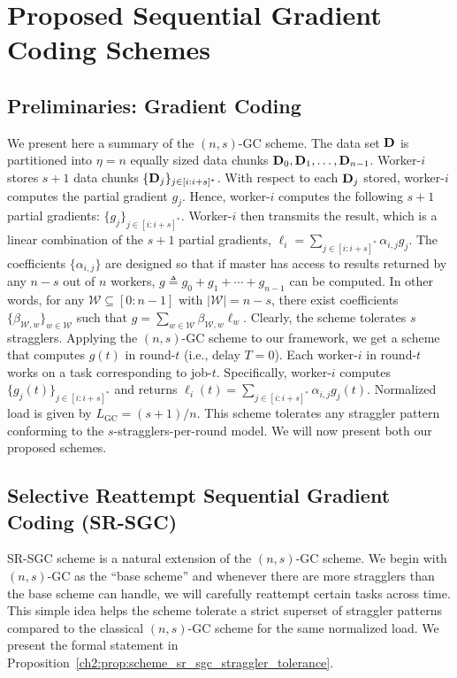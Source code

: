 \section{Proposed Sequential Gradient Coding Schemes}
\subsection{Preliminaries: Gradient Coding}\label{ch2:sec:GC_prelim}

We present here a summary of the $(n,s)$-GC scheme. The data set $\mathbf{D}$ is partitioned into $\eta = n$ equally sized data chunks $\mathbf{D}_0,\mathbf{D}_1,\ldots,\mathbf{D}_{n-1}$.  Worker-$i$ stores $s+1$ data chunks  $\{\mathbf{D}_j\}_{j\in[i:i+s]^*}$. With respect to each $\mathbf{D}_j$ stored, worker-$i$ computes the partial gradient $g_j$. Hence, worker-$i$ computes the following $s+1$ partial gradients: $\{g_j\}_{j\in[i:i+s]^*}$. Worker-$i$ then transmits the result, which is a linear combination of the $s+1$ partial gradients, $\ell_i=\sum_{j\in[i:i+s]^*}\alpha_{i,j}g_j$. The coefficients $\{\alpha_{i,j}\}$ are designed so that if master has access to results returned by any $n-s$ out of $n$ workers, $g\triangleq g_0+g_1+\cdots+g_{n-1}$ can be computed. In other words, for any $\mathcal{W}\subseteq [0:n-1]$ with $|\mathcal{W}|=n-s$, there exist coefficients $\{\beta_{\mathcal{W},w}\}_{w\in\mathcal{W}}$ such that $g=\sum_{w\in\mathcal{W}}\beta_{\mathcal{W},w}\ell_w$. Clearly, the scheme tolerates $s$ stragglers. Applying the $(n,s)$-GC scheme to our framework, we get a scheme that computes $g(t)$ in round-$t$ (i.e., delay $T=0$). Each worker-$i$ in round-$t$ works on a task corresponding to job-$t$. Specifically, worker-$i$ computes $\{g_j(t)\}_{j\in[i:i+s]^*}$ and returns $\ell_i(t)=\sum_{j\in[i:i+s]^*}\alpha_{i,j}g_j(t)$. Normalized load is given by $L_\text{GC}={(s+1)}/{n}$. This scheme tolerates any straggler pattern conforming to the $s$-stragglers-per-round model. We will now present both our proposed schemes.

\subsection{Selective Reattempt Sequential Gradient Coding (SR-SGC)}\label{ch2:sec:sr_sgc}

SR-SGC scheme is a natural extension of the $(n,s)$-GC scheme. We begin with $(n,s)$-GC as the ``base scheme'' and whenever there are more stragglers than the base scheme can handle, we will carefully reattempt certain tasks across time. This simple idea helps the scheme tolerate a strict superset of straggler patterns compared to the classical $(n,s)$-GC scheme for the same normalized load. We present the formal statement in Proposition~\ref{ch2:prop:scheme_sr_sgc_straggler_tolerance}.

